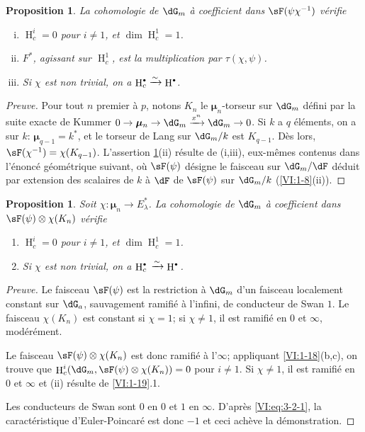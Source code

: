\documentclass[oneside]{book}
\DeclareMathOperator{\h}{H}
\newcommand{\dmu}{{\bm\mu}}
\newcommand{\iso}{\xrightarrow\sim}
\theoremstyle{sga-source}
\theoremstyle{sga-source-dash}
\theoremstyle{sga-source-dotdash}
\theoremstyle{sga-source-number-note-dash}
\theoremstyle{sga-source-note-number-dotdash}
\theoremstyle{sga-source-example-dotdash}
\theoremstyle{sga-source-inline-number}
\theoremstyle{sga-source-bare-number}
\theoremstyle{sga-source}
\newtheorem{proposition_}[subsection]{Proposition}
\let\oldbullet\bullet
\renewcommand{\bullet}{\textnormal{\tiny$\oldbullet$}}
\newcommand{\PrintPage}[1]{}\newcommand{\MathPage}[1]{}\newcommand{\PrintCite}[2]{#1}\newcommand{\var}[3]{#2}
\begin{document}
\begin{proposition_}\label{VI:4-2}
La cohomologie de $\dG_m$ à coefficient dans $\sF(\psi\chi^{-1})$ vérifie 
\begin{enumerate}[(i)]
  \item $\h_c^i=0$ pour $i\ne 1$, et $\dim \h_c^1=1$. 
  \item $F^\ast$, agissant sur $\h_c^1$, est la multiplication par 
    $\tau(\chi,\psi)$. 
  \item Si $\chi$ est non trivial, on a $\h_c^\bullet \iso \h^\bullet$. 
\end{enumerate}
\end{proposition_}
\begin{proof}[Preuve]
Pour tout $n$ premier à $p$, notons $K_n$ le $\dmu_n$-torseur sur $\dG_m$ 
défini par la suite exacte de Kummer 
$0 \to \dmu_n \to \dG_m \xrightarrow{x^n} \dG_m \to 0$. Si $k$ a $q$ 
éléments, on a sur $k$: $\dmu_{q-1}=k^\ast$, et le torseur de Lang sur 
$\dG_m/k$ est $K_{q-1}$. Dès lors, $\sF(\chi^{-1})=\chi(K_{q-1})$. 
L'assertion \ref{VI:4-2}(ii) résulte de (i,iii), eux-mêmes contenus dans 
l'énoncé géométrique suivant, où $\sF(\psi)$ désigne le faisceau 
sur $\dG_m/\dF$ déduit par extension des scalaires de $k$ à $\dF$ de 
$\sF(\psi)$ sur $\dG_m/k$ (\ref{VI:1-8}(ii)). 
\end{proof}





\begin{proposition_}\label{VI:4-3}
Soit $\chi:\dmu_n \to E_\lambda^\ast$. La cohomologie de $\dG_m$ à 
coefficient dans $\sF(\psi)\otimes \chi(K_n)$ vérifie 
\begin{enumerate}[\indent (i)]
  \item $\h_c^i=0$ pour $i\ne 1$, et $\dim \h_c^1{} = 1$. 
  \item Si $\chi$ est non trivial, on a $\h_c^\bullet{}\iso \h^\bullet{}$. 
\end{enumerate}
\end{proposition_}
\PrintPage{197}
\begin{proof}[Preuve]
Le faisceau $\sF(\psi)$ est la restriction à $\dG_m$ d'un faisceau localement 
constant sur $\dG_a$, sauvagement ramifié à l'infini, de conducteur de 
Swan $1$. Le faisceau $\chi(K_n)$ est constant si $\chi=1$; si $\chi\ne 1$, il 
est ramifié en $0$ et $\infty$, modérément. 

Le faisceau $\sF(\psi)\otimes\chi(K_n)$ est donc ramifié à l'$\infty$; 
appliquant \ref{VI:1-18}(b,c), on trouve que 
$\h_c^i(\dG_m,\sF(\psi)\otimes \chi(K_n))=0$ pour $i\ne 1$. Si $\chi\ne 1$, il 
est ramifié en $0$ et $\infty$ et (ii) résulte de \ref{VI:1-19}.1. 

Les conducteurs de Swan sont $0$ en $0$ et $1$ en $\infty$. D'après 
\eqref{VI:eq:3-2-1}, la caractéristique d'Euler-Poincaré est donc $-1$ et 
ceci achève la démonstration. 
\end{proof}
\end{document}
